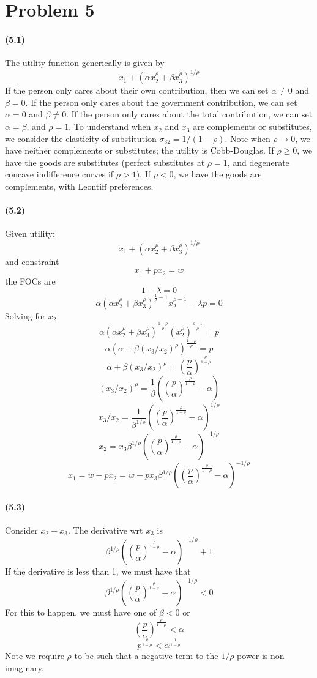 \documentclass[10pt,letter]{article}
\begin{document}
\section*{Problem 5}
\paragraph{(5.1)}
The utility function generically is given by
\[ x_1 + (\alpha x_2^\rho + \beta x_3^\rho)^{1/\rho} \]
If the person only cares about their own contribution, then we can set $\alpha \neq 0$ and $\beta = 0$. If the person only cares about the government contribution, we can set $\alpha = 0$ and $\beta \neq 0$. If the person only cares about the total contribution, we can set $\alpha = \beta$, and $\rho = 1$. To understand when $x_2$ and $x_3$ are complements or substitutes, we consider the elasticity of substitution $ \sigma_{32} = 1/(1-\rho)$. Note when $\rho \to 0$, we have neither complements or substitutes; the utility is Cobb-Douglas. If $\rho \ge 0$, we have the goods are substitutes (perfect substitutes at $\rho = 1$, and degenerate concave indifference curves if $\rho > 1$). If $\rho < 0$, we have the goods are complements, with Leontiff preferences.
\paragraph{(5.2)}
Given utility:
\[ x_1 + (\alpha x_2^\rho + \beta x_3^\rho)^{1/\rho} \]
and constraint
\[ x_1 + px_2 = w \]
the FOCs are
\[ 1 - \lambda = 0 \]
\[ \alpha (\alpha x_2^\rho + \beta x_3^\rho)^{\frac{1}{\rho} - 1}  x_2^{\rho-1}  -\lambda p =0 \]
Solving for $x_2$
\[ \alpha (\alpha x_2^\rho + \beta x_3^\rho)^{\frac{1 - \rho}{\rho}}  \left(x_2^\rho \right)^{\frac{\rho-1}{\rho}} = p  \]
\[ \alpha (\alpha + \beta(x_3 / x_2)^\rho)^{\frac{1 - \rho}{\rho}} = p   \]
\[ \alpha + \beta(x_3/x_2)^\rho = \left(\frac{p}{\alpha}\right)^{\frac{\rho}{1-\rho}} \]
\[ (x_3/x_2)^\rho =  \frac{1}{\beta}\left( \left(\frac{p}{\alpha}\right)^{\frac{\rho}{1-\rho}} - \alpha \right) \]
\[ x_3/x_2 =  \frac{1}{\beta^{1/\rho}}\left( \left(\frac{p}{\alpha}\right)^{\frac{\rho}{1-\rho}} - \alpha \right)^{1/\rho} \]
\[ x_2 =  x_3\beta^{1/\rho}\left( \left(\frac{p}{\alpha}\right)^{\frac{\rho}{1-\rho}} - \alpha \right)^{-1/\rho} \]
\[ x_1 = w - px_2 = w - px_3\beta^{1/\rho}\left( \left(\frac{p}{\alpha}\right)^{\frac{\rho}{1-\rho}} - \alpha \right)^{-1/\rho}\]
\paragraph{(5.3)}
Consider $x_2 + x_3$. The derivative wrt $x_3$ is
\[ \beta^{1/\rho}\left( \left(\frac{p}{\alpha}\right)^{\frac{\rho}{1-\rho}} - \alpha \right)^{-1/\rho} + 1 \]
If the derivative is less than 1, we must have that
\[ \beta^{1/\rho}\left( \left(\frac{p}{\alpha}\right)^{\frac{\rho}{1-\rho}} - \alpha \right)^{-1/\rho} < 0 \]
For this to happen, we must have one of $\beta < 0$ or
\[ \left(\frac{p}{\alpha}\right)^{\frac{\rho}{1-\rho}} <  \alpha \]
\[p^{\frac{\rho}{1-\rho}} <  \alpha^{\frac{1}{1-\rho}} \]
Note we require $\rho$ to be such that a negative term to the $1/\rho$ power is non-imaginary.
\end{document}
